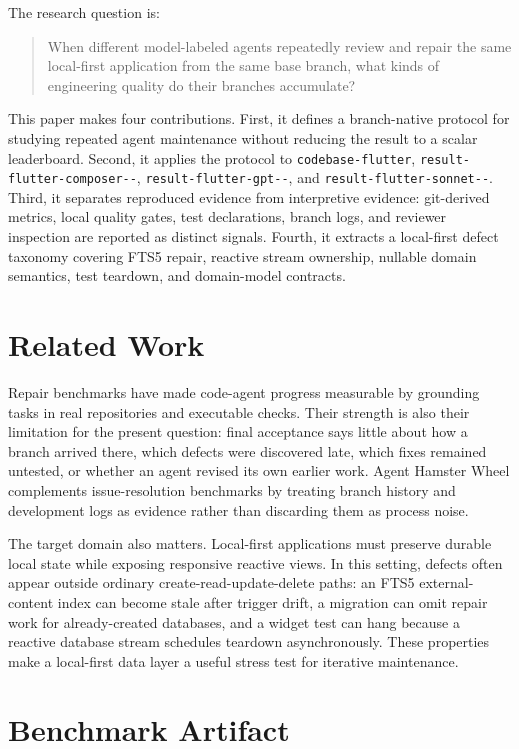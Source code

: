 \documentclass[11pt]{article}
\newcommand{\BaseBranch}{\texttt{codebase-\allowbreak flutter}}
\newcommand{\ComposerBranch}{\texttt{result-\allowbreak flutter-\allowbreak composer-\allowbreak 2-\allowbreak 0}}
\newcommand{\GPTBranch}{\texttt{result-\allowbreak flutter-\allowbreak gpt-\allowbreak 5-\allowbreak 5}}
\newcommand{\SonnetBranch}{\texttt{result-\allowbreak flutter-\allowbreak sonnet-\allowbreak 4-\allowbreak 6}}
\begin{document}
The research question is:

\begin{quote}
When different model-labeled agents repeatedly review and repair the same local-first application from the same base branch, what kinds of engineering quality do their branches accumulate?
\end{quote}

This paper makes four contributions. First, it defines a branch-native protocol for studying repeated agent maintenance without reducing the result to a scalar leaderboard. Second, it applies the protocol to \BaseBranch{}, \ComposerBranch{}, \GPTBranch{}, and \SonnetBranch{}. Third, it separates reproduced evidence from interpretive evidence: git-derived metrics, local quality gates, test declarations, branch logs, and reviewer inspection are reported as distinct signals. Fourth, it extracts a local-first defect taxonomy covering FTS5 repair, reactive stream ownership, nullable domain semantics, test teardown, and domain-model contracts.

\section{Related Work}
\label{sec:related-work}

Repair benchmarks have made code-agent progress measurable by grounding tasks in real repositories and executable checks. Their strength is also their limitation for the present question: final acceptance says little about how a branch arrived there, which defects were discovered late, which fixes remained untested, or whether an agent revised its own earlier work. Agent Hamster Wheel complements issue-resolution benchmarks by treating branch history and development logs as evidence rather than discarding them as process noise.

The target domain also matters. Local-first applications must preserve durable local state while exposing responsive reactive views. In this setting, defects often appear outside ordinary create-read-update-delete paths: an FTS5 external-content index can become stale after trigger drift, a migration can omit repair work for already-created databases, and a widget test can hang because a reactive database stream schedules teardown asynchronously. These properties make a local-first data layer a useful stress test for iterative maintenance.

\section{Benchmark Artifact}
\label{sec:benchmark-artifact}
\end{document}
